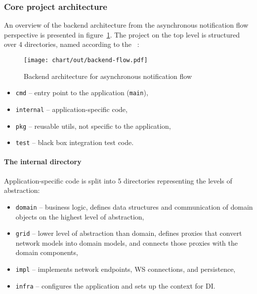 \subsubsection{Core project architecture}\label{sec:core-project-architecture}

An overview of the backend architecture
from the asynchronous notification flow perspective
is presented in figure~\ref{fig:high-level-backend-flow}.
The project on the top level is structured over 4 directories,
named according to
the ~\cite{quest_standard_2022}:

\begin{figure}[h]
      \centering
      \texttt{[image: chart/out/backend-flow.pdf]}
      \caption{Backend architecture for asynchronous notification flow}
      \label{fig:high-level-backend-flow}
\end{figure}

\begin{itemize}
      \item
            \texttt{cmd} -- entry point to the application (\texttt{main}),
      \item
            \texttt{internal} -- application-specific code,
      \item
            \texttt{pkg} -- reusable utils, not specific to the application,
      \item
            \texttt{test} -- black box integration test code.
\end{itemize}

\paragraph*{The internal directory}\label{sec:the-internal-directory}

Application-specific code is split into 5 directories
representing the levels of abstraction:

\begin{itemize}
      \item
            \texttt{domain} -- business logic,
            defines data structures and communication of domain objects
            on the highest level of abstraction,
      \item
            \texttt{grid} -- lower level of abstraction than domain,
            defines proxies that convert network models into domain models,
            and connects those proxies with the domain components,
      \item
            \texttt{impl} -- implements network endpoints,
            \ac{WS} connections, and persistence,
      \item
            \texttt{infra} -- configures the application
            and sets up the context for \ac{DI}.
\end{itemize}

